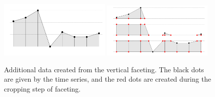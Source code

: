 \documentclass[12pt]{article}
\begin{document}
\begin{itemize}
\begin{center}
\begin{figure}[htp]
\begin{centering}
\includegraphics[width=0.48\textwidth]{graph/pipeline-23-1}
\includegraphics[width=0.48\textwidth]{graph/pipeline-23-2}
\end{centering}
\caption{\label{fig:Additional-data}Additional data created from the vertical
faceting. The black dots are given by the time series, and the red
dots are created during the cropping step of faceting.}
\end{figure}
\end{center}

\end{itemize}
\end{document}
